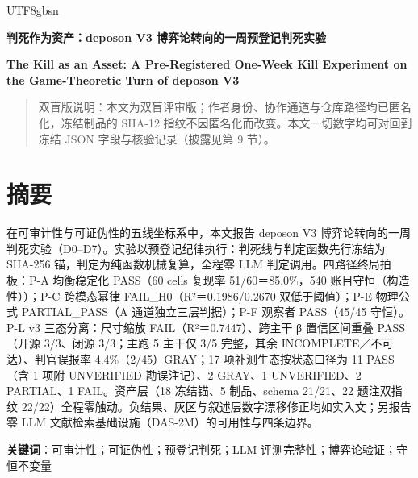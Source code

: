 \documentclass[10pt,a4paper]{article}
\begin{document}
\begin{CJK}{UTF8}{gbsn}
{\centering
{\LARGE\bfseries 判死作为资产：deposon V3 博弈论转向的一周预登记判死实验\par}
\vspace{0.8em}
{\large\bfseries The Kill as an Asset: A Pre-Registered One-Week Kill Experiment on the Game-Theoretic Turn of deposon V3\par}
\vspace{0.2em}
}\par
\vspace{0.3em}
\begin{quote}\small 双盲版说明：本文为双盲评审版；作者身份、协作通道与仓库路径均已匿名化，冻结制品的 SHA-12 指纹不因匿名化而改变。本文一切数字均可对回到冻结 JSON 字段与核验记录（披露见第 9 节）。\end{quote}
\vspace{0.2em}

\section*{摘要}在可审计性与可证伪性的五线坐标系中，本文报告 deposon V3 博弈论转向的一周判死实验（D0–D7）。实验以预登记纪律执行：判死线与判定函数先行冻结为 SHA-256 锚，判定为纯函数机械复算，全程零 LLM 判定调用。四路径终局拍板：P-A 均衡稳定化 PASS（60 cells 复现率 51/60＝85.0\%，540 账目守恒（构造性））；P-C 跨模态幂律 FAIL\_H0（R²＝0.1986/0.2670 双低于阈值）；P-E 物理公式 PARTIAL\_PASS（A 通道独立三层判据）；P-F 观察者 PASS（45/45 守恒）。P-L v3 三态分离：尺寸缩放 FAIL（R²＝0.7447）、跨主干 β 置信区间重叠 PASS（开源 3/3、闭源 3/3；主跑 5 主干仅 3/5 完整，其余 INCOMPLETE／不可达）、判官误报率 4.4\%（2/45）GRAY；17 项补测生态按状态口径为 11 PASS（含 1 项附 UNVERIFIED 勘误注记）、2 GRAY、1 UNVERIFIED、2 PARTIAL、1 FAIL。资产层（18 冻结锚、5 制品、schema 21/21、22 题注双指纹 22/22）全程零触动。负结果、灰区与叙述层数字漂移修正均如实入文；另报告零 LLM 文献检索基础设施（DAS-2M）的可用性与四条边界。

\noindent \textbf{关键词}：可审计性；可证伪性；预登记判死；LLM 评测完整性；博弈论验证；守恒不变量



\end{CJK}
\end{document}
